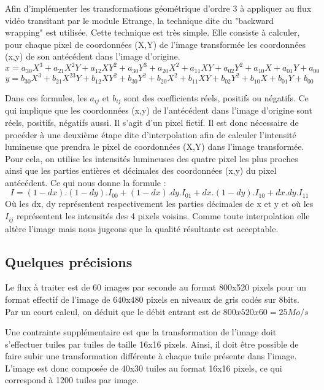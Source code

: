 {Afin d'implémenter les transformations géométrique d'ordre 3 à appliquer au flux vidéo transitant par le module Etrange, la technique dite du "backward wrapping" est utilisée. Cette technique est très simple. Elle consiste à calculer, pour chaque pixel de coordonnées (X,Y) de l'image transformée les coordonnées (x,y) de son antécédent dans l'image d'origine.
\newline
\newline
$$
x = a_{30}X^3 + a_{21}X^2Y + a_{12}XY^2 + a_{30}Y^3
  + a_{20}X^2 + a_{11}XY  + a_{02}Y^2
  + a_{10}X  + a_{01}Y
  + a_{00}
$$
$$
y = b_{30}X^3 + b_{21}X^23Y + b_{12}XY^2 + b_{30}Y^2
  + b_{20}X^2 + b_{11}XY  + b_{02}Y^2 
  + b_{10}X  + b_{01}Y 
  + b_{00}
$$

{Dans ces formules, les $a_{ij}$ et $b_{ij}$ sont des coefficients réels, positifs ou négatifs. Ce qui implique que les coordonnées (x,y) de l'antécédent dans l'image d'origine sont réels, positifs, négatifs aussi. Il s'agit d'un pixel fictif.
Il est donc nécessaire de procéder à une deuxième étape dite d'interpolation afin de calculer l'intensité lumineuse que prendra le pixel de coordonnées (X,Y) dans l'image transformée. Pour cela, on utilise les intensités lumineuses des quatre pixel les plus proches ainsi que les parties entières et décimales des coordonnées (x,y) du pixel antécédent. Ce qui nous donne la formule :
\newline
$$
I = (1-dx).(1-dy).I_{00} + (1-dx).dy.I_{01} + dx.(1-dy).I_{10} + dx.dy.I_{11}
$$
\newline
Où les dx, dy représentent respectivement les parties décimales de x et y et où les $I_{ij}$ représentent les intensités des 4 pixels voisins. Comme toute interpolation elle altère l'image mais nous jugeons que la qualité résultante est acceptable.
}
	\subsection{Quelques précisions}
{
Le flux à traiter est de 60 images par seconde au format 800x520 pixels pour un format effectif de l'image de 640x480 pixels en niveaux de gris codés sur 8bits. Par un court calcul, on déduit que le débit entrant est de $800x520x60 = 25 Mo/s$


Une contrainte supplémentaire est que la transformation de l'image doit s'effectuer tuiles par tuiles de taille 16x16 pixels. Ainsi, il doit être possible de faire subir une transformation différente à chaque tuile présente dans l'image. L'image est donc composée de 40x30 tuiles au format 16x16 pixels, ce qui correspond à 1200 tuiles par image.


}}
